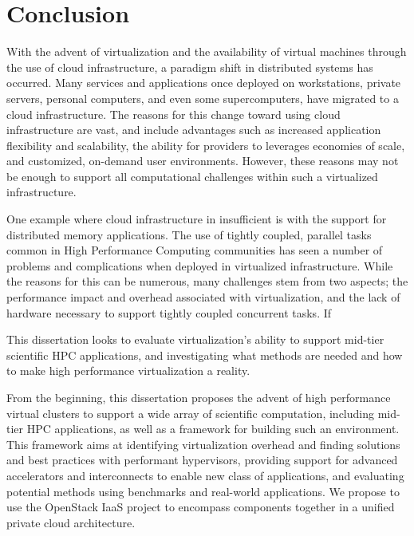 
\chapter{Conclusion}
\label{chap:conc}

With the advent of virtualization and the availability of virtual machines through the use of cloud infrastructure, a paradigm shift in distributed systems has occurred. Many services and applications once deployed on workstations, private servers, personal computers, and even some supercomputers, have migrated to a cloud infrastructure. The reasons for this change toward using cloud infrastructure are vast, and include advantages such as increased application flexibility and scalability, the ability for providers to leverages economies of scale, and customized, on-demand user environments.  However, these reasons may not be enough to support all computational challenges within such a virtualized infrastructure.

One example where cloud infrastructure in insufficient is with the support for distributed memory applications. The use of tightly coupled, parallel tasks common in High Performance Computing communities has seen a number of problems and complications when deployed in virtualized infrastructure.  While the reasons for this can be numerous, many challenges stem from two aspects; the performance impact and overhead associated with virtualization, and the lack of hardware necessary to support tightly coupled concurrent tasks.  If  

This dissertation looks to evaluate virtualization's ability to support mid-tier scientific HPC applications, and investigating what methods are needed and how to make high performance virtualization a reality.


From the beginning, this dissertation proposes the advent of high performance virtual clusters to support a wide array of scientific computation, including mid-tier HPC applications, as well as a framework for building such an environment. This framework aims at identifying virtualization overhead and finding solutions and best practices with performant hypervisors, providing support for advanced accelerators and interconnects to enable new class of applications, and evaluating potential methods using benchmarks and real-world applications.  We propose to use the OpenStack IaaS project to encompass components together in a unified private cloud architecture.  

